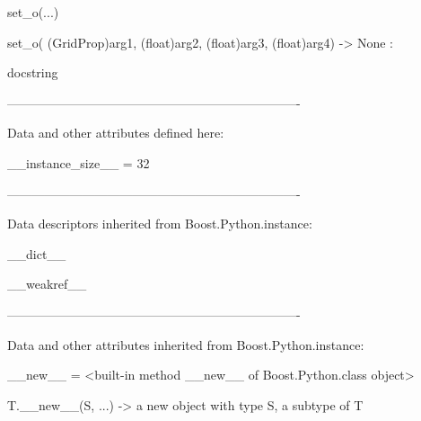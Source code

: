 \documentclass[letterpaper,10pt,english]{sphinxmanual}
\begin{document}
\begin{description}
\begin{description}
\begin{DUlineblock}{0em}
\begin{DUlineblock}{\DUlineblockindent}
\begin{DUlineblock}{\DUlineblockindent}
\item[] 
\end{DUlineblock}
\end{DUlineblock}
\item[] set\_o(...)
\item[]
\begin{DUlineblock}{\DUlineblockindent}
\item[] set\_o( (GridProp)arg1, (float)arg2, (float)arg3, (float)arg4) -\textgreater{} None :
\item[]
\begin{DUlineblock}{\DUlineblockindent}
\item[] docstring
\item[] 
\end{DUlineblock}
\end{DUlineblock}
\item[] ----------------------------------------------------------------------
\item[] Data and other attributes defined here:
\item[] 
\item[] \_\_instance\_size\_\_ = 32
\item[] 
\item[] ----------------------------------------------------------------------
\item[] Data descriptors inherited from Boost.Python.instance:
\item[] 
\item[] \_\_dict\_\_
\item[] 
\item[] \_\_weakref\_\_
\item[] 
\item[] ----------------------------------------------------------------------
\item[] Data and other attributes inherited from Boost.Python.instance:
\item[] 
\item[] \_\_new\_\_ = \textless{}built-in method \_\_new\_\_ of Boost.Python.class object\textgreater{}
\item[]
\begin{DUlineblock}{\DUlineblockindent}
\item[] T.\_\_new\_\_(S, ...) -\textgreater{} a new object with type S, a subtype of T
\end{DUlineblock}
\end{DUlineblock}


\end{description}
\end{description}
\end{document}
